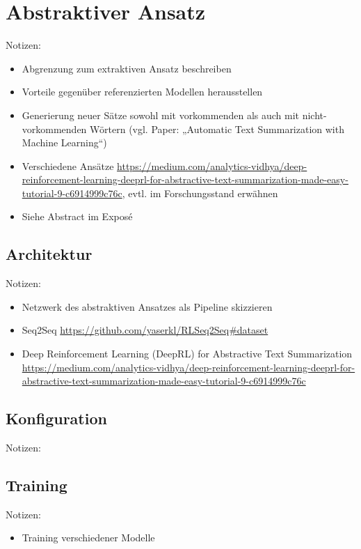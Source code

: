 \chapter{Abstraktiver Ansatz}
\thispagestyle{fancy}
\label{chap:Abstraktiver Ansatz}

Notizen:
\begin{itemize}
	\item Abgrenzung zum extraktiven Ansatz beschreiben
	\item Vorteile gegenüber referenzierten Modellen herausstellen
	\item Generierung neuer Sätze sowohl mit vorkommenden als auch mit nicht-vorkommenden Wörtern (vgl. Paper: „Automatic Text Summarization with Machine Learning“)
	\item Verschiedene Ansätze \url{https://medium.com/analytics-vidhya/deep-reinforcement-learning-deeprl-for-abstractive-text-summarization-made-easy-tutorial-9-c6914999c76c}, evtl. im Forschungsstand erwähnen
	\item Siehe Abstract im Exposé
\end{itemize}


\section{Architektur}
Notizen:
\begin{itemize}
	\item Netzwerk des abstraktiven Ansatzes als Pipeline skizzieren
	\item Seq2Seq \url{https://github.com/yaserkl/RLSeq2Seq#dataset}
	\item Deep Reinforcement Learning (DeepRL) for Abstractive Text Summarization \url{https://medium.com/analytics-vidhya/deep-reinforcement-learning-deeprl-for-abstractive-text-summarization-made-easy-tutorial-9-c6914999c76c}
\end{itemize}


\section{Konfiguration}
Notizen:


\section{Training}
Notizen:
\begin{itemize}
	\item Training verschiedener Modelle
\end{itemize}


